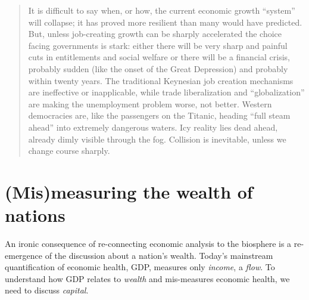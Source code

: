 \begin{quote}
	It is difficult to say when, or how, the current economic growth ``system'' will collapse;
	it has proved more resilient than many would have predicted. 
	But, unless job-creating growth can be sharply accelerated 
	the choice facing governments is stark: 
	either there will be very sharp and painful cuts 
	in entitlements and social welfare or there will be a financial crisis,
	probably sudden (like the onset of the Great Depression) and probably within twenty years. 
	The traditional Keynesian job creation mechanisms are ineffective or inapplicable, 
	while trade liberalization and ``globalization'' 
	are making the unemployment problem worse, not better.
	Western democracies are, 
	like the passengers on the Titanic, 
	heading ``full steam ahead'' into
	extremely dangerous waters. 
	Icy reality lies dead ahead, 
	already dimly visible through the fog.
	Collision is inevitable, 
	unless we change course sharply.\cite{Ayres:1996aa}
\end{quote}




\section{(Mis)measuring the wealth of nations}
\label{sec:wealth_nations}

An ironic consequence of re-connecting economic analysis to the biosphere is a 
re-emergence of the discussion about a nation's wealth. 
Today's mainstream quantification of economic health, GDP, 
measures only \emph{income}, a \emph{flow}.  
To understand how GDP relates to \emph{wealth} and mis-measures economic health, 
we need to discuss \emph{capital}.

